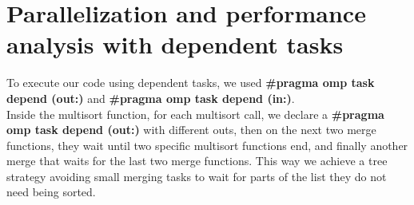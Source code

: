 \documentclass[12]{article}
\begin{document}
\section{Parallelization and performance analysis with dependent tasks}
To execute our code using dependent tasks, we used \textbf{#pragma omp task depend (out:)} and \textbf{#pragma omp task depend (in:)}.
\\
Inside the multisort function, for each multisort call, we declare a \textbf{#pragma omp task depend (out:)} with different outs, then on the next two merge functions, they wait until two specific multisort functions end, and finally another merge that waits for the last two merge functions. This way we achieve a tree strategy avoiding small merging tasks to wait for parts of the list they do not need being sorted. 
\medskip
\end{document}
